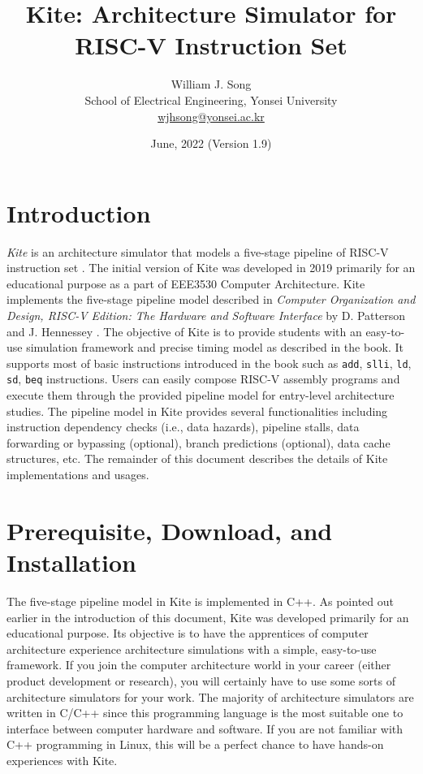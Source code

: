 \documentclass[10pt]{article}
\begin{document}
\title{Kite: Architecture Simulator for RISC-V Instruction Set}
\author{William J. Song\\
        School of Electrical Engineering, Yonsei University\\
        \href{mailto:wjhsong@yonsei.ac.kr}{wjhsong@yonsei.ac.kr}}
\date{June, 2022 (Version 1.9)}
\maketitle


\section{Introduction} \label{sec:introduction}
\emph{Kite} is an architecture simulator that models a five-stage pipeline of RISC-V instruction set \cite{waterman_riscv2019}.
The initial version of Kite was developed in 2019 primarily for an educational purpose as a part of EEE3530 Computer Architecture.
Kite implements the five-stage pipeline model described in \emph{Computer Organization and Design, RISC-V Edition: The Hardware and Software Interface} by D. Patterson and J. Hennessey \cite{patterson_morgan2017}.
The objective of Kite is to provide students with an easy-to-use simulation framework and precise timing model as described in the book.
It supports most of basic instructions introduced in the book such as {\tt add}, {\tt slli}, {\tt ld}, {\tt sd}, {\tt beq} instructions.
Users can easily compose RISC-V assembly programs and execute them through the provided pipeline model for entry-level architecture studies.
The pipeline model in Kite provides several functionalities including instruction dependency checks (i.e., data hazards), pipeline stalls, data forwarding or bypassing (optional), branch predictions (optional), data cache structures, etc.
The remainder of this document describes the details of Kite implementations and usages.


\section{Prerequisite, Download, and Installation} \label{sec:install}
The five-stage pipeline model in Kite is implemented in C++.
As pointed out earlier in the introduction of this document, Kite was developed primarily for an educational purpose.
Its objective is to have the apprentices of computer architecture experience architecture simulations with a simple, easy-to-use framework.
If you join the computer architecture world in your career (either product development or research), you will certainly have to use some sorts of architecture simulators for your work.
The majority of architecture simulators are written in C/C++ since this programming language is the most suitable one to interface between computer hardware and software.
If you are not familiar with C++ programming in Linux, this will be a perfect chance to have hands-on experiences with Kite.
\end{document}
